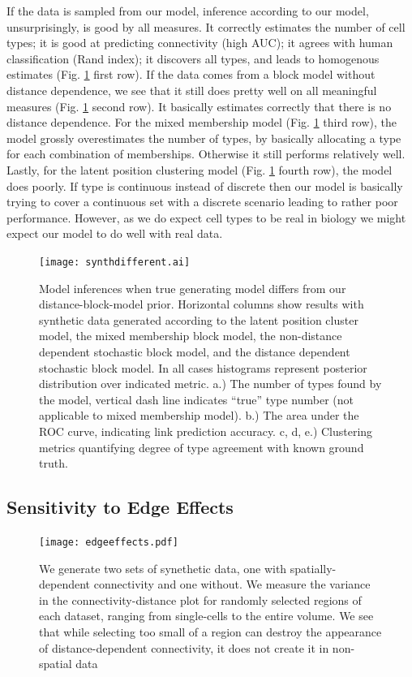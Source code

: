 \documentclass{article}
\begin{document}
If the data is sampled from our model, inference according to our model, unsurprisingly, is good by all measures. It correctly estimates the number of cell types; it is good at predicting connectivity (high AUC); it agrees with human classification (Rand index); it discovers all types, and leads to homogenous estimates (Fig. \ref{fig:othermodel} first row). If the data comes from a block model without distance dependence, we see that it still does pretty well on all meaningful measures (Fig. \ref{fig:othermodel} second row). It basically estimates correctly that there is no distance dependence. For the mixed membership model (Fig. \ref{fig:othermodel} third row), the model grossly overestimates the number of types, by basically allocating a type for each combination of memberships. Otherwise it still performs relatively well. Lastly, for the latent position clustering model (Fig. \ref{fig:othermodel} fourth row), the model does poorly. If type is continuous instead of discrete then our model is basically trying to cover a continuous set with a discrete scenario leading to rather poor performance. However, as we do expect cell types to be real in biology we might expect our model to do well with real data. 

\begin{figure}
  \centering 

  \texttt{[image: synthdifferent.ai]}
  \caption{Model inferences when true generating model differs from our distance-block-model prior. Horizontal columns show results with synthetic data generated according to the latent position cluster model, the mixed membership block model, the non-distance dependent stochastic block model, and the distance dependent stochastic block model. In all cases histograms represent posterior distribution over indicated metric. a.) The number of types found by the model, vertical dash line indicates ``true'' type number (not applicable to mixed membership model). b.) The area under the ROC curve, indicating link prediction accuracy. c, d, e.) Clustering metrics
quantifying degree of type agreement with known ground truth. }

  \label{fig:othermodel}
\end{figure}



\subsection*{Sensitivity to Edge Effects} 

\begin{figure}
  \centering 
  \centerline{\texttt{[image: edgeeffects.pdf]}}
  \caption{We generate two sets of synethetic data, one with
    spatially-dependent connectivity and one without. We measure the
    variance in the connectivity-distance plot for randomly selected
    regions of each dataset, ranging from single-cells to the entire
    volume. We see that while selecting too small of a region can 
    destroy the appearance of distance-dependent connectivity, 
    it does not create it in non-spatial data}
\label{fig:edgeeffects}
\end{figure}
\end{document}
